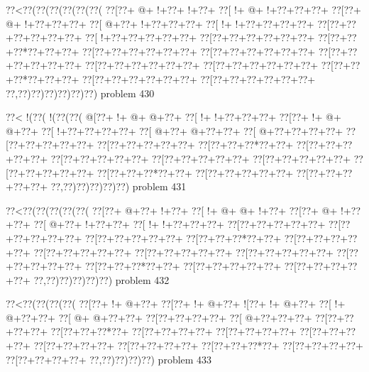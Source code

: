 \vbox{\vbox{\goo
\0??<\0??(\0??(\0??(\0??(\0??(\0??(
\0??[\0??+\- @+\- !+\0??+\- !+\0??+
\0??[\- !+\- @+\- !+\0??+\0??+\0??+
\0??[\0??+\- @+\- !+\0??+\0??+\0??+
\0??[\- @+\0??+\- !+\0??+\0??+\0??+
\0??[\- !+\- !+\0??+\0??+\0??+\0??+
\0??[\0??+\0??+\0??+\0??+\0??+\0??+
\0??[\- !+\0??+\0??+\0??+\0??+\0??+
\0??[\0??+\0??+\0??+\0??+\0??+\0??+
\0??[\0??+\0??+\0??*\0??+\0??+\0??+
\0??[\0??+\0??+\0??+\0??+\0??+\0??+
\0??[\0??+\0??+\0??+\0??+\0??+\0??+
\0??[\0??+\0??+\0??+\0??+\0??+\0??+
\0??[\0??+\0??+\0??+\0??+\0??+\0??+
\0??[\0??+\0??+\0??+\0??+\0??+\0??+
\0??[\0??+\0??+\0??*\0??+\0??+\0??+
\0??[\0??+\0??+\0??+\0??+\0??+\0??+
\0??[\0??+\0??+\0??+\0??+\0??+\0??+
\0??,\0??)\0??)\0??)\0??)\0??)\0??)
}
\hfil problem 430\hfil\break
}

\vbox{\vbox{\goo
\0??<\- !(\0??(\- !(\0??(\0??(
\- @[\0??+\- !+\- @+\- @+\0??+
\0??[\- !+\- !+\0??+\0??+\0??+
\0??[\0??+\- !+\- @+\- @+\0??+
\0??[\- !+\0??+\0??+\0??+\0??+
\0??[\- @+\0??+\- @+\0??+\0??+
\0??[\- @+\0??+\0??+\0??+\0??+
\0??[\0??+\0??+\0??+\0??+\0??+
\0??[\0??+\0??+\0??+\0??+\0??+
\0??[\0??+\0??+\0??*\0??+\0??+
\0??[\0??+\0??+\0??+\0??+\0??+
\0??[\0??+\0??+\0??+\0??+\0??+
\0??[\0??+\0??+\0??+\0??+\0??+
\0??[\0??+\0??+\0??+\0??+\0??+
\0??[\0??+\0??+\0??+\0??+\0??+
\0??[\0??+\0??+\0??*\0??+\0??+
\0??[\0??+\0??+\0??+\0??+\0??+
\0??[\0??+\0??+\0??+\0??+\0??+
\0??,\0??)\0??)\0??)\0??)\0??)
}
\hfil problem 431\hfil\break
}

\vbox{\vbox{\goo
\0??<\0??(\0??(\0??(\0??(\0??(
\0??[\0??+\- @+\0??+\- !+\0??+
\0??[\- !+\- @+\- @+\- !+\0??+
\0??[\0??+\- @+\- !+\0??+\0??+
\0??[\- @+\0??+\- !+\0??+\0??+
\0??[\- !+\- !+\0??+\0??+\0??+
\0??[\0??+\0??+\0??+\0??+\0??+
\0??[\0??+\0??+\0??+\0??+\0??+
\0??[\0??+\0??+\0??+\0??+\0??+
\0??[\0??+\0??+\0??*\0??+\0??+
\0??[\0??+\0??+\0??+\0??+\0??+
\0??[\0??+\0??+\0??+\0??+\0??+
\0??[\0??+\0??+\0??+\0??+\0??+
\0??[\0??+\0??+\0??+\0??+\0??+
\0??[\0??+\0??+\0??+\0??+\0??+
\0??[\0??+\0??+\0??*\0??+\0??+
\0??[\0??+\0??+\0??+\0??+\0??+
\0??[\0??+\0??+\0??+\0??+\0??+
\0??,\0??)\0??)\0??)\0??)\0??)
}
\hfil problem 432\hfil\break
}

\vbox{\vbox{\goo
\0??<\0??(\0??(\0??(\0??(
\0??[\0??+\- !+\- @+\0??+
\0??[\0??+\- !+\- @+\0??+
\- ![\0??+\- !+\- @+\0??+
\0??[\- !+\- @+\0??+\0??+
\0??[\- @+\- @+\0??+\0??+
\0??[\0??+\0??+\0??+\0??+
\0??[\- @+\0??+\0??+\0??+
\0??[\0??+\0??+\0??+\0??+
\0??[\0??+\0??+\0??*\0??+
\0??[\0??+\0??+\0??+\0??+
\0??[\0??+\0??+\0??+\0??+
\0??[\0??+\0??+\0??+\0??+
\0??[\0??+\0??+\0??+\0??+
\0??[\0??+\0??+\0??+\0??+
\0??[\0??+\0??+\0??*\0??+
\0??[\0??+\0??+\0??+\0??+
\0??[\0??+\0??+\0??+\0??+
\0??,\0??)\0??)\0??)\0??)
}
\hfil problem 433\hfil\break
}

